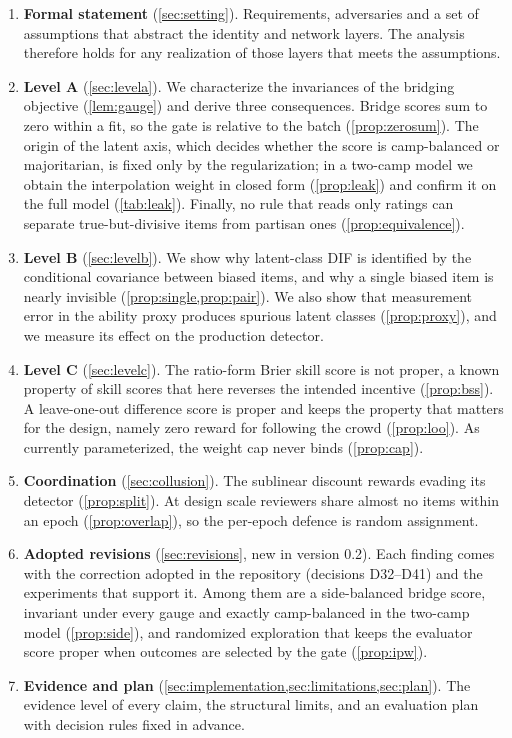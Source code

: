 \begin{enumerate}
  \item \textbf{Formal statement} (\cref{sec:setting}). Requirements, adversaries and a set
    of assumptions that abstract the identity and network layers. The analysis therefore
    holds for any realization of those layers that meets the assumptions.
  \item \textbf{Level A} (\cref{sec:levela}). We characterize the invariances of the
    bridging objective (\cref{lem:gauge}) and derive three consequences. Bridge scores sum to
    zero within a fit, so the gate is relative to the batch (\cref{prop:zerosum}). The origin
    of the latent axis, which decides whether the score is camp-balanced or majoritarian, is
    fixed only by the regularization; in a two-camp model we obtain the interpolation weight
    in closed form (\cref{prop:leak}) and confirm it on the full model (\cref{tab:leak}).
    Finally, no rule that reads only ratings can separate true-but-divisive items from
    partisan ones (\cref{prop:equivalence}).
  \item \textbf{Level B} (\cref{sec:levelb}). We show why latent-class DIF is identified by
    the conditional covariance between biased items, and why a single biased item is nearly
    invisible (\cref{prop:single,prop:pair}). We also show that measurement error in the
    ability proxy produces spurious latent classes (\cref{prop:proxy}), and we measure its
    effect on the production detector.
  \item \textbf{Level C} (\cref{sec:levelc}). The ratio-form Brier skill score is not proper,
    a known property of skill scores that here reverses the intended incentive (\cref{prop:bss}). A leave-one-out difference score is proper and keeps the property that
    matters for the design, namely zero reward for following the crowd (\cref{prop:loo}).
    As currently parameterized, the weight cap never binds (\cref{prop:cap}).
  \item \textbf{Coordination} (\cref{sec:collusion}). The sublinear discount rewards evading
    its detector (\cref{prop:split}). At design scale reviewers share almost no items within
    an epoch (\cref{prop:overlap}), so the per-epoch defence is random assignment.
  \item \textbf{Adopted revisions} (\cref{sec:revisions}, new in version 0.2). Each finding comes
    with the correction adopted in the repository (decisions D32--D41) and the experiments that
    support it. Among them are a side-balanced bridge score, invariant under every gauge and exactly
    camp-balanced in the two-camp model (\cref{prop:side}), and randomized exploration that keeps
    the evaluator score proper when outcomes are selected by the gate (\cref{prop:ipw}).
  \item \textbf{Evidence and plan} (\cref{sec:implementation,sec:limitations,sec:plan}).
    The evidence level of every claim, the structural limits, and an evaluation plan with
    decision rules fixed in advance.
\end{enumerate}

